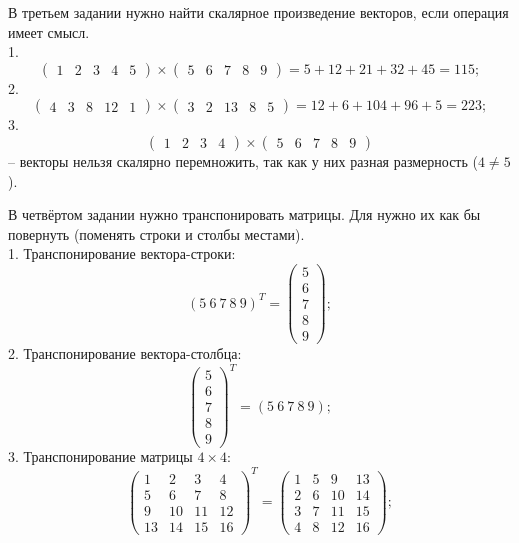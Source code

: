 \documentclass[14pt,a4paper]{extarticle}
\begin{document}
В третьем задании нужно найти скалярное произведение векторов, если операция имеет смысл.\\
1. \[\begin{pmatrix} 1 & 2 & 3 & 4 & 5 \end{pmatrix}\times\begin{pmatrix} 5 & 6 & 7 & 8 & 9 \end{pmatrix} = 5 + 12 + 21 + 32 + 45 = 115;\]
2. \[\begin{pmatrix} 4 & 3 & 8 & 12 & 1 \end{pmatrix}\times\begin{pmatrix} 3 & 2 & 13 & 8 & 5 \end{pmatrix} = 12 + 6 + 104 + 96 + 5 = 223;\]
3. \[\begin{pmatrix} 1 & 2 & 3 & 4 \end{pmatrix}\times\begin{pmatrix} 5 & 6 & 7 & 8 & 9 \end{pmatrix}\]
-- векторы нельзя скалярно перемножить, так как у них разная размерность ($4 \neq 5$).

В четвёртом задании нужно транспонировать матрицы. Для нужно их как бы повернуть (поменять строки и столбы местами).\\
1. Транспонирование вектора-строки:
\[
(5\ 6\ 7\ 8\ 9)^T = \begin{pmatrix} 5 \\ 6 \\ 7 \\ 8 \\ 9 \end{pmatrix};\]
2. Транспонирование вектора-столбца:
\[
\begin{pmatrix}
5 \\
6 \\
7 \\
8 \\
9
\end{pmatrix}^T = (5\ 6\ 7\ 8\ 9);\]
3. Транспонирование матрицы $4\times4$:
\[
\begin{pmatrix}
1 & 2 & 3 & 4 \\
5 & 6 & 7 & 8 \\
9 & 10 & 11 & 12 \\
13 & 14 & 15 & 16
\end{pmatrix}^T = 
\begin{pmatrix}
1 & 5 & 9 & 13 \\
2 & 6 & 10 & 14 \\
3 & 7 & 11 & 15 \\
4 & 8 & 12 & 16
\end{pmatrix};
\]
\end{document}
